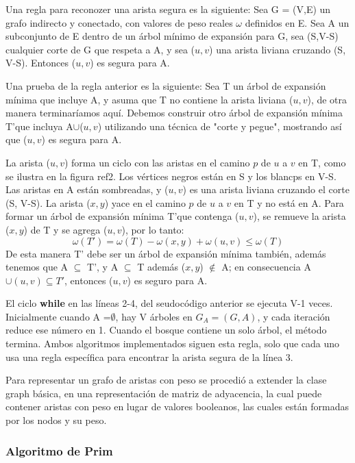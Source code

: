 \documentclass[a4paper, 11pt]{report}
\begin{document}
Una regla para reconozer una arista segura es la siguiente: Sea G = (V,E) un grafo indirecto y conectado, con valores de peso reales $\omega$ definidos en E. Sea A un subconjunto de E dentro de un árbol mínimo de expansión para G, sea (S,V-S) cualquier corte de G que respeta a A, y sea ($u, v$) una arista liviana cruzando (S, V-S). Entonces ($u, v$) es segura para A.

Una prueba de la regla anterior es la siguiente:
Sea T un árbol de expansión mínima que incluye A, y asuma que T no contiene la arista liviana ($u,v$), de otra manera terminaríamos aquí. Debemos construir otro árbol de expansión mínima T'que incluya A$\cup${($u,v$)} utilizando una técnica de "corte y pegue", mostrando así que ($u,v$) es segura para A.

La arista ($u, v$) forma un ciclo con las aristas en el camino $p$ de $u$ a $v$ en T, como se ilustra en la figura ref2. Los vértices negros están en S y los blancps en V-S. Las aristas en A están sombreadas, y ($u, v$) es una arista liviana cruzando el corte (S, V-S). La arista ($x, y$) yace en el camino $p$ de $u$ a $v$ en T y no está en A. Para formar un árbol de expansión mínima T'que contenga ($u, v$), se remueve la arista ($x, y$) de T y se agrega ($u, v$), por lo tanto:
\begin{equation}
\omega(T') = \omega(T) - \omega(x,y) + \omega(u,v)\leq \omega(T) 
\end{equation}
De esta manera T' debe ser un árbol de expansión mínima también, además tenemos que A $\subseteq$ T', y A $\subseteq$ T además ($x, y$) $\notin$ A; en consecuencia A$\cup {(u, v)} \subseteq T'$, entonces ($u, v$) es seguro para A.

El ciclo \textbf{while} en las líneas 2-4, del seudocódigo anterior se ejecuta V-1 veces. Inicialmente cuando A =$ \emptyset$, hay V árboles en $G_A = (G,A)$, y cada iteración reduce ese número en 1. Cuando el bosque contiene un solo árbol, el método termina. Ambos algoritmos implementados siguen esta regla, solo que cada uno usa una regla específica para encontrar la arista segura de la línea 3.


Para representar un grafo de aristas con peso se procedió a extender la clase graph básica, en una representación de matriz de adyacencia, la cual puede contener aristas con peso en lugar de valores booleanos, las cuales están formadas por los nodos y su peso.

\subsubsection{Algoritmo de Prim}
\end{document}
